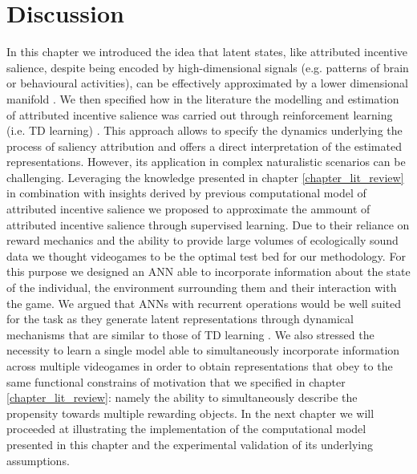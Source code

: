 \section{Discussion}
In this chapter we introduced the idea that latent states, like attributed incentive salience, despite being encoded by high-dimensional signals (e.g. patterns of brain or behavioural activities), can be effectively approximated by a lower dimensional manifold \cite{gallego2017neural, derdikman2011manifold, nieh2021geometry, bromberg2010coding, seung2000manifold, ganmor2015thesaurus, stopfer2003intensity}. We then specified how in the literature the modelling and estimation of attributed incentive salience was carried out through reinforcement learning (i.e. TD learning) \cite{mcclure2003computational,zhang2009neural}. This approach allows to specify the dynamics underlying the process of saliency attribution and offers a direct interpretation of the estimated representations. However, its application in complex naturalistic scenarios can be challenging. Leveraging the knowledge presented in chapter \ref{chapter_lit_review} in combination with insights derived by previous computational model of attributed incentive salience \cite{mcclure2003computational,zhang2009neural} we proposed to approximate the ammount of attributed incentive salience through supervised learning. Due to their reliance on reward mechanics and the ability to provide large volumes of ecologically sound data we thought videogames to be the optimal test bed for our methodology. For this purpose we designed an ANN able to incorporate information about the state of the individual, the environment surrounding them and their interaction with the game. We argued that ANNs with recurrent operations would be well suited for the task as they generate latent representations through dynamical mechanisms that are similar to those of TD learning \cite{barto2004reinforcement}. We also stressed the necessity to learn a single model able to simultaneously incorporate information across multiple videogames in order to obtain representations that obey to the same functional constrains of motivation that we specified in chapter \ref{chapter_lit_review}: namely the ability to simultaneously describe the propensity towards multiple rewarding objects. In the next chapter we will proceeded at illustrating the implementation of the computational model presented in this chapter and the experimental validation of its underlying assumptions.